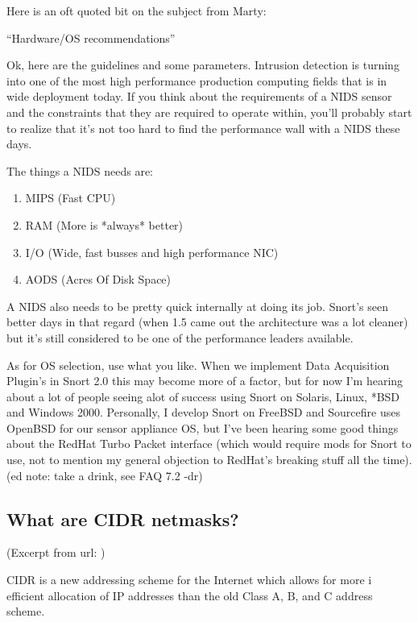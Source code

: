 \documentclass{article}
\begin{document}
Here is an oft quoted bit on the subject from Marty:

``Hardware/OS recommendations''

Ok, here are the guidelines and some parameters. Intrusion detection is turning
into one of the most high performance production computing fields that is in
wide deployment today. If you think about the requirements of a NIDS sensor and
the constraints that they are required to operate within, you'll probably start
to realize that it's not too hard to find the performance wall with a NIDS
these days.

The things a NIDS needs are:
\begin{enumerate}
\item  MIPS (Fast CPU)
\item  RAM (More is *always* better)
\item  I/O (Wide, fast busses and high performance NIC)
\item  AODS (Acres Of Disk Space)
\end{enumerate}

A NIDS also needs to be pretty quick internally at doing its job. Snort's seen
better days in that regard (when 1.5 came out the architecture was a lot
cleaner) but it's still considered to be one of the performance leaders
available.

As for OS selection, use what you like. When we implement Data Acquisition
Plugin's in Snort 2.0 this may become more of a factor, but for now I'm hearing
about a lot of people seeing alot of success using Snort on Solaris, Linux,
*BSD and Windows 2000. Personally, I develop Snort on FreeBSD and Sourcefire
uses OpenBSD for our sensor appliance OS, but I've been hearing some good
things about the RedHat Turbo Packet interface (which would require mods for
Snort to use, not to mention my general objection to RedHat's breaking stuff
all the time). (ed note: take a drink, see FAQ 7.2 -dr)

\subsection{What are CIDR netmasks? }

(Excerpt from url: )

CIDR is a new addressing scheme for the Internet which allows for more i
efficient allocation of IP addresses than the old Class A, B, and C address 
scheme.
\end{document}
